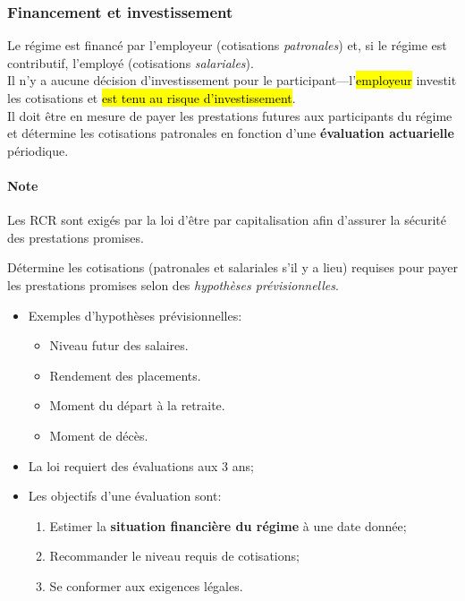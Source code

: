 \documentclass[10pt, french]{article}
\begin{document}
\begin{multicols*}{3}
\subsubsection*{Financement et investissement}

Le régime est financé par l'employeur (cotisations \textit{patronales}) et, si le régime est contributif, l'employé (cotisations \textit{salariales}).\\

Il n'y a aucune décision d'investissement pour le participant---l'\hl{employeur} investit les cotisations et \hl{est tenu au risque d'investissement}. \\

Il doit être en mesure de payer les prestations futures aux participants du régime et détermine les cotisations patronales en fonction d'une \textbf{évaluation actuarielle} périodique. 

\paragraph*{Note}	Les RCR sont exigés par la loi d'être par capitalisation afin d'assurer la sécurité des prestations promises.

\begin{definitionNOHFILLsub}
Détermine les cotisations (patronales et salariales s'il y a lieu) requises pour payer les prestations promises selon des \textit{hypothèses prévisionnelles}.

\begin{itemize}[leftmargin = *]
	\item	Exemples d'hypothèses prévisionnelles:
		\begin{itemize}[leftmargin = *]
		\item	Niveau futur des salaires.
		\item	Rendement des placements.
		\item	Moment du départ à la retraite.
		\item	Moment de décès.
		\end{itemize}
	\item	La loi requiert des évaluations aux 3 ans;
	\item	Les objectifs d'une évaluation sont:
		\begin{enumerate}
		\item	Estimer la \textbf{situation financière du régime} à une date donnée;
		\item	Recommander le niveau requis de cotisations;
		\item	Se conformer aux exigences légales.
		\end{enumerate}
\end{itemize}
\end{definitionNOHFILLsub}


\end{multicols*}
\end{document}
